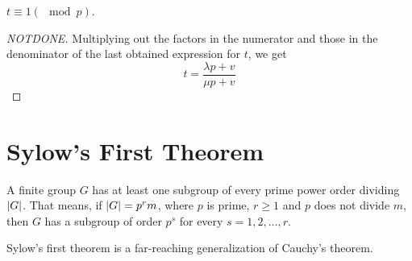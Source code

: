 \documentclass[../main-sheet.tex]{subfiles}
\begin{document}
\begin{cor}\label{cor:10.3}
    \(t \equiv 1 (\mod p)\).
\end{cor}
\begin{proof}[NOTDONE]
    Multiplying out the factors in the numerator and those in the denominator of the
    last obtained expression for \(t\), we get
    \[t=\frac{\lambda p+v}{\mu p+v}\]
\end{proof}
    \section{Sylow's First Theorem}
    \begin{thm}
        A finite group \(G\) has at least one subgroup of every prime power order
        dividing \(\left\vert G\right\vert\). That means, if \(\left\vert G\right\vert = p^rm\), where \(p\) is prime, \(r\geq 1\) and \(p\) does not divide \(m\), then \(G\) has a subgroup of order \(p^s\) for every \(s=1,2,\dots,r\).
    \end{thm}
    \begin{note}
        Sylow's first theorem is a far-reaching generalization of Cauchy's theorem.
    \end{note}
\end{document}
